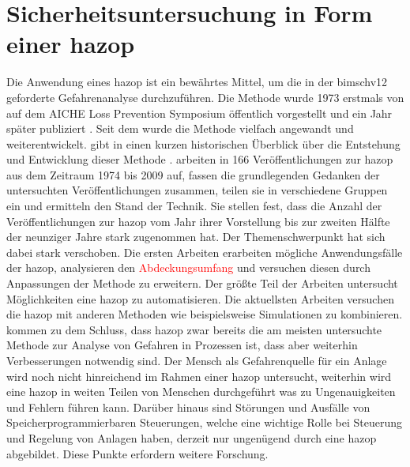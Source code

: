 \section{Sicherheitsuntersuchung in Form einer \ac{hazop}}\label{sec:sdt_hazop}
Die Anwendung eines \acf{hazop} ist ein bew\"ahrtes Mittel, um die in der \ac{bimschv12} geforderte Gefahrenanalyse durchzuf\"uhren. Die Methode wurde 1973 erstmals von \citeauthor{Lawley_1974} auf dem AICHE Loss Prevention Symposium \"offentlich vorgestellt und ein Jahr sp\"ater publiziert \cite{Lawley_1974}. Seit dem wurde die Methode vielfach angewandt und weiterentwickelt. \newline
\citeauthor{Kletz_1997} gibt in  einen kurzen historischen \"Uberblick \"uber die Entstehung und Entwicklung dieser Methode \cite{Kletz_1997}. \citeauthor{Dunjo_2010} arbeiten in  166 Ver\"offentlichungen zur \ac{hazop} aus dem Zeitraum 1974 bis 2009 auf, fassen die grundlegenden Gedanken der untersuchten Ver\"offentlichungen zusammen, teilen sie in verschiedene Gruppen ein und ermitteln den Stand der Technik. Sie stellen fest, dass die Anzahl der Ver\"offentlichungen zur \ac{hazop} vom Jahr ihrer Vorstellung bis zur zweiten H\"alfte der neunziger Jahre stark zugenommen hat. Der Themenschwerpunkt hat sich dabei stark verschoben. Die ersten Arbeiten erarbeiten m\"ogliche Anwendungsf\"alle der \ac{hazop}, analysieren den \textcolor{red}{Abdeckungsumfang} und versuchen diesen durch Anpassungen der Methode zu erweitern. Der gr\"o\ss{}te Teil der Arbeiten untersucht M\"oglichkeiten eine \ac{hazop} zu automatisieren. Die aktuellsten Arbeiten versuchen die \ac{hazop} mit anderen Methoden wie beispielsweise Simulationen zu kombinieren. \citeauthor{Dunjo_2010} kommen zu dem Schluss, dass \ac{hazop} zwar bereits die am meisten untersuchte Methode zur Analyse von Gefahren in Prozessen ist, dass aber weiterhin Verbesserungen notwendig sind. Der Mensch als Gefahrenquelle f\"ur ein Anlage wird noch nicht hinreichend im Rahmen einer \ac{hazop} untersucht, weiterhin wird eine \ac{hazop} in weiten Teilen von Menschen durchgef\"uhrt was zu Ungenauigkeiten und Fehlern f\"uhren kann. Dar\"uber hinaus sind St\"orungen und Ausf\"alle von Speicherprogrammierbaren Steuerungen, welche eine wichtige Rolle bei Steuerung und Regelung von Anlagen haben, derzeit nur ungen\"ugend durch eine \ac{hazop} abgebildet. Diese Punkte erfordern weitere Forschung.

